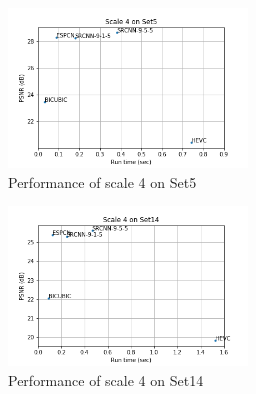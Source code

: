 \documentclass[12pt,journal,compsoc]{IEEEtran}
\begin{document}
\begin{figure}[!t] 
\centering
\includegraphics[width=2.5in]{performance-sc4-Set5.png}
\caption{Performance of scale 4 on Set5}
\label{fig_5}
\end{figure}

\begin{figure}[!t] 
\centering
\includegraphics[width=2.5in]{performance-sc4-Set14.png}
\caption{Performance of scale 4 on Set14}
\label{fig_6}
\end{figure}
\end{document}
